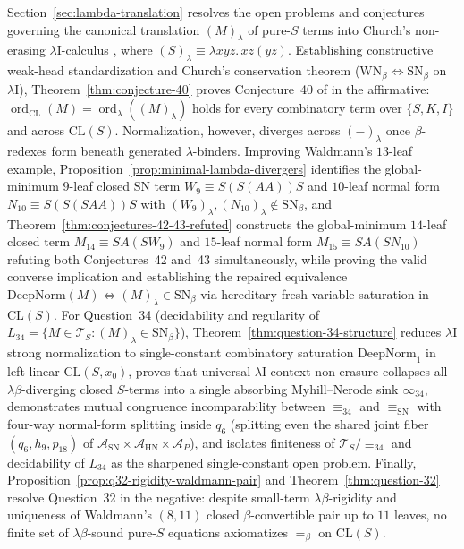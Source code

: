 \documentclass[11pt,reqno]{amsart}
\numberwithin{equation}{section}
\theoremstyle{plain}
\theoremstyle{definition}
\theoremstyle{remark}
\DeclareMathOperator{\ord}{ord}
\newcommand{\CLS}{\mathrm{CL}(S)}
\newcommand{\TS}{\mathcal{T}_S}
\newcommand{\SN}{\mathrm{SN}}
\newcommand{\WN}{\mathrm{WN}}
\newcommand{\HN}{\mathrm{HN}}
\begin{document}
Section~\ref{sec:lambda-translation} resolves the open problems and conjectures governing the canonical translation $(M)_\lambda$ of pure-$S$ terms into Church's non-erasing $\lambda\mathrm{I}$-calculus \cite{Church1941}, where $(S)_\lambda \equiv \lambda x y z.\, x z (y z)$. Establishing constructive weak-head standardization and Church's conservation theorem ($\WN_\beta \iff \SN_\beta$ on $\lambda\mathrm{I}$), Theorem~\ref{thm:conjecture-40} proves Conjecture~40 of \cite{BarendregtEndrullisKlopWaldmann2017} in the affirmative: $\ord_{\mathrm{CL}}(M) = \ord_\lambda((M)_\lambda)$ holds for every combinatory term over $\{S, K, I\}$ and across $\CLS$. Normalization, however, diverges across $(-)_\lambda$ once $\beta$-redexes form beneath generated $\lambda$-binders. Improving Waldmann's $13$-leaf example, Proposition~\ref{prop:minimal-lambda-divergers} identifies the global-minimum $9$-leaf closed $\SN$ term $W_9 \equiv S(S(A A))S$ and $10$-leaf normal form $N_{10} \equiv S(S(S A A))S$ with $(W_9)_\lambda, (N_{10})_\lambda \notin \SN_\beta$, and Theorem~\ref{thm:conjectures-42-43-refuted} constructs the global-minimum $14$-leaf closed term $M_{14} \equiv S A (S W_9)$ and $15$-leaf normal form $M_{15} \equiv S A (S N_{10})$ refuting both Conjectures~42 and~43 simultaneously, while proving the valid converse implication and establishing the repaired equivalence $\mathrm{DeepNorm}(M) \iff (M)_\lambda \in \SN_\beta$ via hereditary fresh-variable saturation in $\CLS$. For Question~34 (decidability and regularity of $L_{34} = \{M \in \TS : (M)_\lambda \in \SN_\beta\}$), Theorem~\ref{thm:question-34-structure} reduces $\lambda\mathrm{I}$ strong normalization to single-constant combinatory saturation $\mathrm{DeepNorm}_1$ in left-linear $\mathrm{CL}(S, x_0)$, proves that universal $\lambda\mathrm{I}$ context non-erasure collapses all $\lambda\beta$-diverging closed $S$-terms into a single absorbing Myhill--Nerode sink $\infty_{34}$, demonstrates mutual congruence incomparability between $\equiv_{34}$ and $\equiv_{\SN}$ with four-way normal-form splitting inside $q_6$ (splitting even the shared joint fiber $(q_6, h_9, p_{18})$ of $\mathcal{A}_{\SN} \times \mathcal{A}_{\HN} \times \mathcal{A}_P$), and isolates finiteness of $\TS / {\equiv_{34}}$ and decidability of $L_{34}$ as the sharpened single-constant open problem. Finally, Proposition~\ref{prop:q32-rigidity-waldmann-pair} and Theorem~\ref{thm:question-32} resolve Question~32 in the negative: despite small-term $\lambda\beta$-rigidity and uniqueness of Waldmann's $(8,11)$ closed $\beta$-convertible pair up to $11$ leaves, no finite set of $\lambda\beta$-sound pure-$S$ equations axiomatizes $=_\beta$ on $\CLS$.
\end{document}
